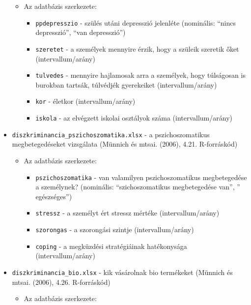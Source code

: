 \documentclass[
  letterpaper,
]{krantz}
\providecommand{\tightlist}{%
  \setlength{\itemsep}{0pt}\setlength{\parskip}{0pt}}\usepackage{longtable,booktabs,array}
\begin{document}
\begin{itemize}
  \begin{itemize}
  \item
    Az adatbázis szerkezete:

    \begin{itemize}
    \tightlist
    \item
      \texttt{ppdepresszio} - szülés utáni depresszió jelenléte
      (nominális: ``nincs depresszió'', ``van depresszió'')
    \item
      \texttt{szeretet} - a személyek mennyire érzik, hogy a szüleik
      szeretik őket (intervallum/arány)
    \item
      \texttt{tulvedes} - mennyire hajlamosak arra a személyek, hogy
      túlságosan is burokban tartsák, túlvédjék gyerekeiket
      (intervallum/arány)
    \item
      \texttt{kor} - életkor (intervallum/arány)
    \item
      \texttt{iskola} - az elvégzett iskolai osztályok száma
      (intervallum/arány)
    \end{itemize}
  \end{itemize}
\item
  \texttt{diszkriminancia\_pszichoszomatika.xlsx} - a pszichoszomatikus
  megbetegedéseket vizsgálata (Münnich és mtsai. (2006), 4.21.
  R-forráskód)

  \begin{itemize}
  \tightlist
  \item
    Az adatbázis szerkezete:

    \begin{itemize}
    \tightlist
    \item
      \texttt{pszichoszomatika} - van valamilyen pszichoszomatikus
      megbetegedése a személynek? (nominális: ``szichoszomatikus
      megbetegedése van'', '' egészséges'')
    \item
      \texttt{stressz} - a személyt ért stressz mértéke
      (intervallum/arány)
    \item
      \texttt{szorongas} - a szorongási szintje (intervallum/arány)
    \item
      \texttt{coping} - a megküzdési stratégiáinak hatékonysága
      (intervallum/arány)
    \end{itemize}
  \end{itemize}
\item
  \texttt{diszkriminancia\_bio.xlsx} - kik vásárolnak bio termékeket
  (Münnich és mtsai. (2006), 4.26. R-forráskód)

  \begin{itemize}
  \item
    Az adatbázis szerkezete:


\end{itemize}
\end{itemize}
\end{document}
